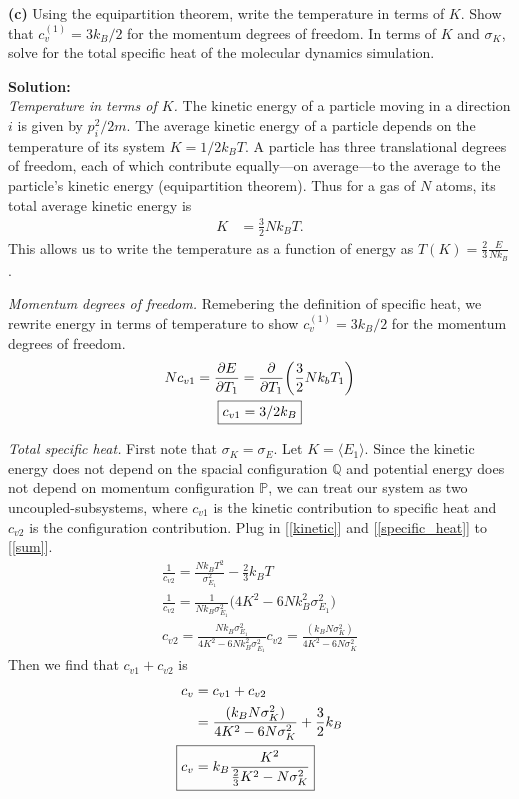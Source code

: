 \documentclass{article}
\newenvironment{question}[0]{
\vspace{2mm}
\noindent
\itshape
}
\numberwithin{equation}{section}
\begin{document}
\begin{question}
\textnormal{\textbf{(c)}}
Using the equipartition theorem, write the temperature in terms of $K$. Show that $c_v^{(1)} = 3k_B/2$ for the momentum degrees of freedom. In terms of $K$ and $\sigma_K$, solve for the total specific heat of the molecular dynamics simulation.
\end{question}

\vspace{2mm}
\noindent
\textbf{Solution:}\\
\emph{Temperature in terms of $K$.}
The kinetic energy of a particle moving in a direction $i$ is given by $p_i^2/2m$. The average kinetic energy of a particle depends on the temperature of its system $K = 1/2 k_B T$. A particle has three translational degrees of freedom, each of which contribute equally---on average---to the average to the particle's kinetic energy (equipartition theorem). Thus for a gas of $N$ atoms, its total average kinetic energy is
\begin{align}
K &= \frac{3}{2} N k_B T.\label{kinetic}
\end{align}
This allows us to write the temperature as a function of energy as $\boxed{T(K) = \frac{2}{3}\frac{E}{Nk_B}}$.

\vspace{2mm}
\noindent
\emph{Momentum degrees of freedom.}
Remebering the definition of specific heat, we rewrite energy in terms of temperature to show $c_v^{(1)} = 3k_B/2$ for the momentum degrees of freedom.
\begin{gather}
Nc_{v1} = \pdv{E}{T_1} = \pdv{T_1} \bigg( \frac{3}{2} N k_b T_1 \bigg)
\\
\boxed{c_{v1} = 3/2 k_B}\label{specific_heat}
\end{gather}


\vspace{2mm}
\noindent
\emph{Total specific heat.}
First note that $\sigma_K = \sigma_{E}$.
Let $K = \langle E_1 \rangle$. Since the kinetic energy does not depend on the spacial configuration $\mathbb{Q}$ and potential energy does not depend on momentum configuration $\mathbb{P}$, we can treat our system as two uncoupled-subsystems, where $c_{v1}$ is the kinetic contribution to specific heat and $c_{v2}$ is the configuration contribution. Plug in [\ref{kinetic}] and [\ref{specific_heat}] to [\ref{sum}].
\begin{gather}
\frac{1}{c_{v2}} = \frac{Nk_BT^2}{\sigma^2_{E_1}} - \frac{2}{3}k_BT
\\
\frac{1}{c_{v2}} = \frac{1}{N k_B \sigma^2_{E_1}} \bigg(4K^2 - 6Nk_B^2 \sigma^2_{E_1}  \bigg)
\\
c_{v2} = \frac{N k_B \sigma^2_{E_1}}{4K^2 - 6Nk_B^2 \sigma^2_{E_1}}
c_{v2} = \frac{(k_B N \sigma^2_K)}{4K^2 - 6N\sigma^2_K}
\end{gather}
Then we find that $c_{v1} + c_{v2}$ is
\begin{align}
c_v &= c_{v1} + c_{v2}
\\
&= \frac{(k_B N \sigma^2_K)}{4K^2 - 6N\sigma^2_K} + \frac{3}{2}k_B
\\
\Aboxed{
c_v &= k_B \frac{K^2}{\frac{2}{3}K^2 - N\sigma_K^2}}
\end{align}
\end{document}
